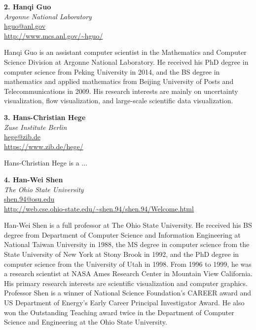 \documentclass[preprint,journal]{vgtc}       %
\newcommand{\addverticalspace}{\vspace{3mm}}
\begin{document}
\printbibliography[title={Relevant Publications},category=Dutta]

\addverticalspace

\noindent \textbf{2. Hanqi Guo}\\
\emph{Argonne National Laboratory}\\
\href{mailto:hguo@anl.gov}{hguo@anl.gov}\\
\url{http://www.mcs.anl.gov/~hguo/}

\addverticalspace

Hanqi Guo is an assistant computer scientist in the Mathematics and Computer Science Division at Argonne National Laboratory.  He received his PhD degree in computer science from Peking University in 2014, and the BS degree in mathematics and applied mathematics from Beijing University of Posts and Telecommunications in 2009. His research interests are mainly on uncertainty visualization, flow visualization, and large-scale scientific data visualization.

\printbibliography[title={Relevant Publications},category=Guo]

\addverticalspace

\noindent \textbf{3. Hans-Christian Hege}\\
\emph{Zuse Institute Berlin}\\
\href{mailto:hege@zib.de}{hege@zib.de}\\
\url{https://www.zib.de/hege/}

\addverticalspace

Hans-Christian Hege is a ...

\printbibliography[title={Relevant Publications},category=Hege]


\noindent \textbf{4. Han-Wei Shen}\\
\emph{The Ohio State University}\\
\href{mailto:shen.94@osu.edu}{shen.94@osu.edu}\\
\url{http://web.cse.ohio-state.edu/~shen.94/shen.94/Welcome.html}

\addverticalspace
Han-Wei Shen is a full professor at The Ohio State University. He received his BS degree from Department of Computer Science and Information Engineering at National Taiwan University in 1988, the MS degree in computer science from the State University of New York at Stony Brook in 1992, and the PhD degree in computer science from the University of Utah in 1998. From 1996 to 1999, he was a research scientist at NASA Ames Research Center in Mountain View California. His primary research interests are scientific visualization and computer graphics. Professor Shen is a winner of National Science Foundation's CAREER award and US Department of Energy's Early Career Principal Investigator Award. He also won the Outstanding Teaching award twice in the Department of Computer Science and Engineering at the Ohio State University.

\printbibliography[title={Relevant Publications},category=Shen]

\addverticalspace



% 
% 
\end{document}

